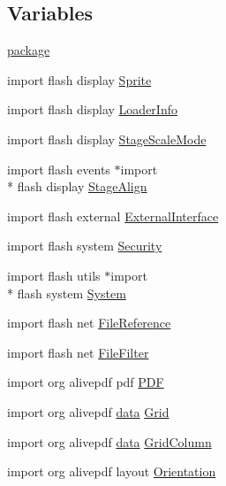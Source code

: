 \subsection*{Variables}
\begin{DoxyCompactItemize}
\item 
\hyperlink{_zero_clipboard_pdf_8as_a5f90b32dbc783ac82e8621cea6b3b3ef}{package}
\item 
import flash display \hyperlink{_zero_clipboard_pdf_8as_a042194dccb28a568ca64f8525721c60a}{Sprite}
\item 
import flash display \hyperlink{_zero_clipboard_pdf_8as_ad50f418ba9beb1fbb43185baa35ec4a2}{Loader\+Info}
\item 
import flash display \hyperlink{_zero_clipboard_pdf_8as_a9712fefc0286413e0d285a5b0fd83376}{Stage\+Scale\+Mode}
\item 
import flash events $\ast$import \\*
flash display \hyperlink{_zero_clipboard_pdf_8as_a65934e40e78800e97f0a74d031566cf3}{Stage\+Align}
\item 
import flash external \hyperlink{_zero_clipboard_pdf_8as_a8adbb9e92ce78f1cd583ebf4ff65e221}{External\+Interface}
\item 
import flash system \hyperlink{_zero_clipboard_pdf_8as_ae6834b84bc690e04dba52c72b66ee901}{Security}
\item 
import flash utils $\ast$import \\*
flash system \hyperlink{_zero_clipboard_pdf_8as_aa9096e3fcab84f69b6438f42c99b82a7}{System}
\item 
import flash net \hyperlink{_zero_clipboard_pdf_8as_a151f8adb645ca8d486cccdf7d20fa78c}{File\+Reference}
\item 
import flash net \hyperlink{_zero_clipboard_pdf_8as_a11e5599edf00e50cbf0be6d87f6b21c6}{File\+Filter}
\item 
import org alivepdf pdf \hyperlink{_zero_clipboard_pdf_8as_ae0219320eeb74f155e0b1373d22e2628}{P\+D\+F}
\item 
import org alivepdf \hyperlink{fullpage_2plugin_8js_a718c1bf5a3bf21ebb980203b142e5b75}{data} \hyperlink{_zero_clipboard_pdf_8as_ace5cd40904967d6585c3cf19616bb59e}{Grid}
\item 
import org alivepdf \hyperlink{fullpage_2plugin_8js_a718c1bf5a3bf21ebb980203b142e5b75}{data} \hyperlink{_zero_clipboard_pdf_8as_a2e4ffddb46ce775420f6cc4ffa506530}{Grid\+Column}
\item 
import org alivepdf layout \hyperlink{_zero_clipboard_pdf_8as_a81f0d741031f7031fb40839216ad1bc2}{Orientation}

\end{DoxyCompactItemize}
